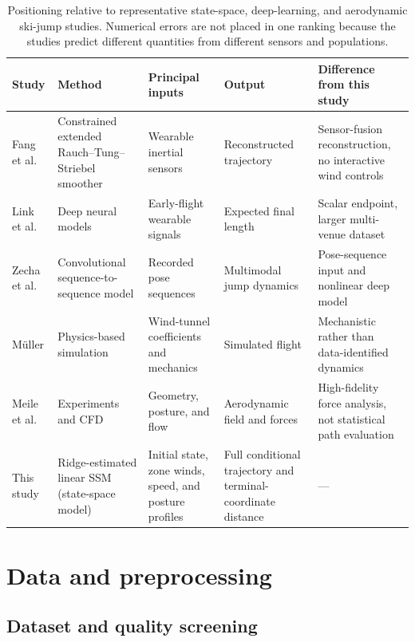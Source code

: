 \documentclass[11pt,twoside,a4paper]{article}
\begin{document}
\begin{table}[t]
\centering
\small
\begin{tabularx}{\textwidth}{@{}L{2.7cm}L{3.0cm}L{3.1cm}L{3.0cm}>{\raggedright\arraybackslash}X@{}}
\toprule
Study & Method & Principal inputs & Output & Difference from this study \\
\midrule
Fang et al. \cite{fang2020trajectory} & Constrained extended Rauch--Tung--Striebel smoother & Wearable inertial sensors & Reconstructed trajectory & Sensor-fusion reconstruction, no interactive wind controls \\
Link et al. \cite{schwinn2022xlength} & Deep neural models & Early-flight wearable signals & Expected final length & Scalar endpoint, larger multi-venue dataset \\
Zecha et al. \cite{zecha2018convolutional} & Convolutional sequence-to-sequence model & Recorded pose sequences & Multimodal jump dynamics & Pose-sequence input and nonlinear deep model \\
Müller \cite{muller2008simulation} & Physics-based simulation & Wind-tunnel coefficients and mechanics & Simulated flight & Mechanistic rather than data-identified dynamics \\
Meile et al. \cite{meile2006aerodynamics} & Experiments and CFD & Geometry, posture, and flow & Aerodynamic field and forces & High-fidelity force analysis, not statistical path evaluation \\
This study & Ridge-estimated linear SSM (state-space model) & Initial state, zone winds, speed, and posture profiles & Full conditional trajectory and terminal-coordinate distance & --- \\
\bottomrule
\end{tabularx}
\caption{Positioning relative to representative state-space, deep-learning, and aerodynamic ski-jump studies. Numerical errors are not placed in one ranking because the studies predict different quantities from different sensors and populations.}
\label{tab:related}
\end{table}

\section{Data and preprocessing}\label{sec:data}

\subsection{Dataset and quality screening}
\end{document}
